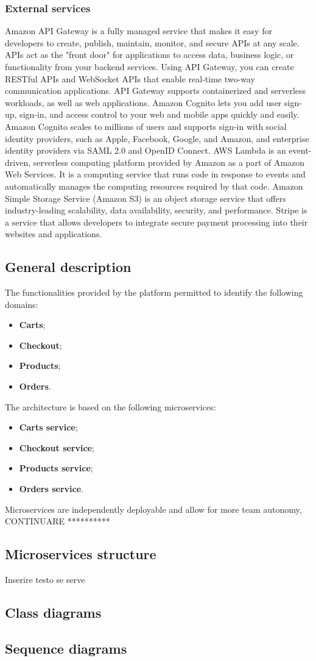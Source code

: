 \subsubsection{External services}
Amazon API Gateway is a fully managed service that makes it easy for developers to create, publish, maintain, monitor,
and secure APIs at any scale. APIs act as the "front door" for applications to access data, business logic,
or functionality from your backend services. Using API Gateway, you can create RESTful APIs and WebSocket APIs that
enable real-time two-way communication applications. API Gateway supports containerized and serverless workloads,
as well as web applications.
Amazon Cognito lets you add user sign-up, sign-in, and access control to your web and mobile apps quickly and easily.
Amazon Cognito scales to millions of users and supports sign-in with social identity providers, such as Apple,
Facebook, Google, and Amazon, and enterprise identity providers via SAML 2.0 and OpenID Connect.
AWS Lambda is an event-driven, serverless computing platform provided by Amazon as a part of Amazon Web Services.
It is a computing service that runs code in response to events and automatically manages the computing resources required by that code.
Amazon Simple Storage Service (Amazon S3) is an object storage service that offers industry-leading scalability,
data availability, security, and performance.
Stripe is a service that allows developers to integrate secure payment processing into their websites and applications.
\subsection{General description}
The functionalities provided by the platform permitted to identify the following domains:
\begin{itemize}
    \item \textbf{Carts};
    \item \textbf{Checkout};
    \item \textbf{Products};
    \item \textbf{Orders}.
\end{itemize}
The architecture is based on the following microservices:
\begin{itemize}
    \item \textbf{Carts service};
    \item \textbf{Checkout service};
    \item \textbf{Products service};
    \item \textbf{Orders service}.
\end{itemize}
Microservices are independently deployable and allow for more team autonomy, CONTINUARE **********
\subsection{Microservices structure}
Inserire testo se serve
\subsection{Class diagrams}
\subsection{Sequence diagrams}
